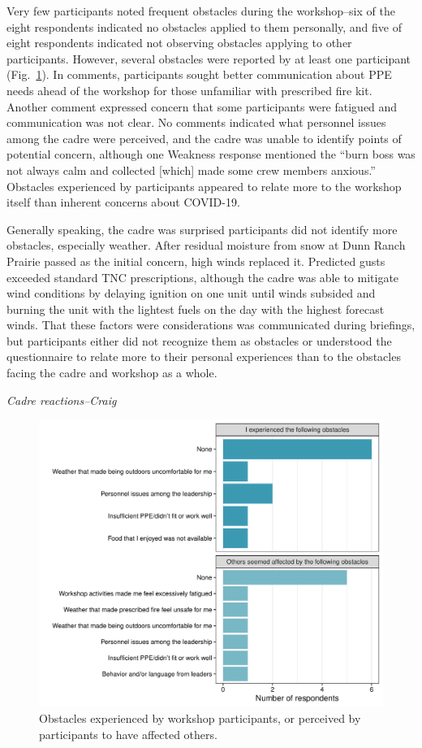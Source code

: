 \documentclass[fire,article,submit,moreauthors,pdftex]{Definitions/mdpi}
\begin{document}
Very few participants noted frequent obstacles during the workshop--six of the eight respondents indicated no obstacles applied to them personally, and five of eight respondents indicated not observing obstacles applying to other participants.
However, several obstacles were reported by at least one participant (Fig.~\ref{obstacles}).
In comments, participants sought better communication about PPE needs ahead of the workshop for those unfamiliar with prescribed fire kit.
Another comment expressed concern that some participants were fatigued and communication was not clear.
No comments indicated what personnel issues among the cadre were perceived, and the cadre was unable to identify points of potential concern, although one Weakness response mentioned the ``burn boss was not always calm and collected {[}which{]} made some crew members anxious.''
Obstacles experienced by participants appeared to relate more to the workshop itself than inherent concerns about COVID-19.

Generally speaking, the cadre was surprised participants did not identify more obstacles, especially weather.
After residual moisture from snow at Dunn Ranch Prairie passed as the initial concern, high winds replaced it.
Predicted gusts exceeded standard TNC prescriptions, although the cadre was able to mitigate wind conditions by delaying ignition on one unit until winds subsided and burning the unit with the lightest fuels on the day with the highest forecast winds.
That these factors were considerations was communicated during briefings, but participants either did not recognize them as obstacles or understood the questionnaire to relate more to their personal experiences than to the obstacles facing the cadre and workshop as a whole.

\emph{Cadre reactions--Craig}

\begin{figure}
\centering
\includegraphics[width=1\columnwidth]{obstacles_gg-1.pdf}
\caption{Obstacles experienced by workshop participants, or perceived by participants to have affected others. \label{obstacles}}
\end{figure}
\end{document}
